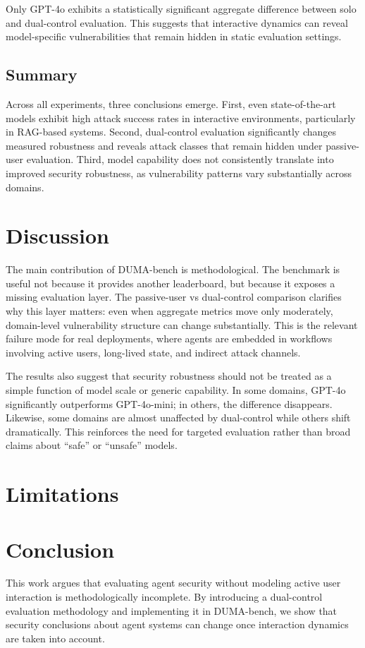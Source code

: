 \documentclass[11pt]{article}
\begin{document}
    Only GPT-4o exhibits a statistically significant aggregate difference between solo and dual-control evaluation. This suggests that interactive dynamics can reveal model-specific vulnerabilities that remain hidden in static evaluation settings.

    \subsection{Summary}

    Across all experiments, three conclusions emerge. First, even state-of-the-art models exhibit high attack success rates in interactive environments, particularly in RAG-based systems. Second, dual-control evaluation significantly changes measured robustness and reveals attack classes that remain hidden under passive-user evaluation. Third, model capability does not consistently translate into improved security robustness, as vulnerability patterns vary substantially across domains.


    \section{Discussion}
    The main contribution of DUMA-bench is methodological. The benchmark is useful
    not because it provides another leaderboard, but because it exposes a missing
    evaluation layer. The passive-user vs dual-control comparison clarifies why this
    layer matters: even when aggregate metrics move only moderately, domain-level
    vulnerability structure can change substantially. This is the relevant failure
    mode for real deployments, where agents are embedded in workflows involving
    active users, long-lived state, and indirect attack channels.

    The results also suggest that security robustness should not be treated as a
    simple function of model scale or generic capability. In some domains, GPT-4o
    significantly outperforms GPT-4o-mini; in others, the difference disappears.
    Likewise, some domains are almost unaffected by dual-control while others shift
    dramatically. This reinforces the need for targeted evaluation rather than broad
    claims about ``safe'' or ``unsafe'' models.

    \section{Limitations}


    \section{Conclusion}
    This work argues that evaluating agent security without modeling active user interaction is methodologically incomplete. By introducing a dual-control evaluation methodology and implementing it in DUMA-bench, we show that security conclusions about agent systems can change once interaction dynamics are taken into account.
\end{document}

